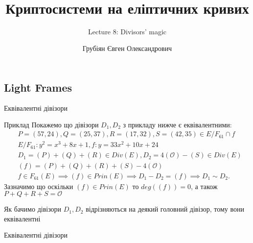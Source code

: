 \documentclass[9pt]{beamer}
\title{Криптосистеми на еліптичних кривих} %
\subtitle{Lecture 8: Divisors' magic}
\author{Грубіян Євген Олександрович}
\begin{document}
  \frame{\maketitle}


  \begin{darkframes}
      
    \section{Light Frames}
\begin{frame}{Еквівалентні дівізори}

\begin{exampleblock}{Приклад}
Покажемо що дівізори $D_1, D_2$ з прикладу нижче є еквівалентними:
\begin{align*}
    & P = (57, 24), Q = (25, 37), R = (17, 32), S = (42, 35) \in E/F_{61} \cap f \\
    & E/F_{61}: y^2 = x^3 + 8x + 1, f : y = 33x^2 + 10x + 24 \\
    & D_1 = (P ) + (Q) + (R) \in Div(E), D_2 = 4(\mathcal{O}) - (S) \in Div(E) \\
    & (f ) = (P ) + (Q) + (R) + (S) - 4(\mathcal{O}) \\
    &f \in F_{61}(E) \implies (f) \in Prin(E) \implies D_1 - D_2 = (f) \implies D_1 \sim D_2.
\end{align*}
Зазначимо що оскільки $(f) \in Prin(E)$ то $deg((f))=0$, а також $P+Q+R+S=\mathcal{O}$

Як бачимо дівізори $D_1,D_2$ відрізняються на деякий головний дівізор, тому вони еквівалентні
\end{exampleblock}
     
\end{frame}

\begin{frame}{Еквівалентні дівізори}

\begin{figure}
\centering
{}
\end{figure}
\end{frame}
\end{darkframes}
\end{document}
